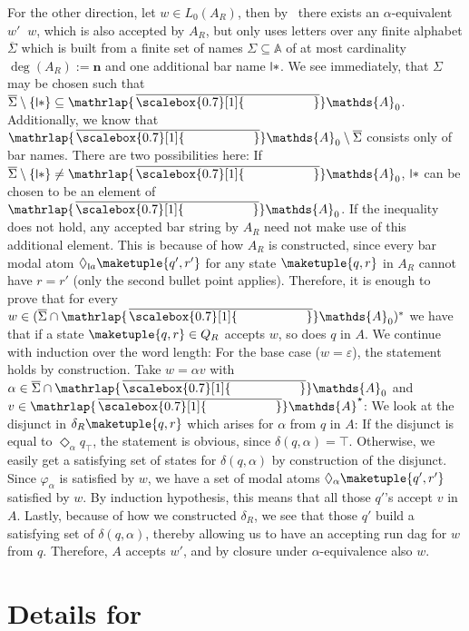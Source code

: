 \documentclass[10pt,a4paper]{amsart}
\theoremstyle{definition}
\newcommand{\seq}{\subseteq}
\newcommand{\At}{\mathds{A}}
\newcommand{\barAs}{\barNames^{\star}}
\newcommand{\names}{\At}
\newcommand{\set}[1]{\{#1\}}
\DeclareMathOperator{\alphaequiv}{\equiv_{\alpha}}
\newcommand{\mybar}[3]{%
  \mathrlap{\hspace{#2}\overline{\scalebox{#1}[1]{\phantom{\ensuremath{#3}}}}}\ensuremath{#3}
}
\newcommand{\barNames}{{\mybar{0.7}{1.25pt}{\names}}}
\newcommand{\midmid}{\hspace{0.2ex}{\rule[-0.1ex]{0.6pt}{1.65ex}}\hspace{0.2ex}}
\newcommand{\scriptmidmid}{\hspace{0.2ex}{\rule[-0.1ex]{0.6pt}{1.1ex}}\hspace{0.2ex}}
\newcommand{\newletter}[1]{{\midmid}#1}
\newcommand{\scriptnew}[1]{{\scriptmidmid}#1}
\begin{document}
\begin{IEEEproof}
  For the other direction, let $w \in L_0(A_R)$, then by~ there exists an
  $\alpha$-equivalent $w' \alphaequiv w$, which is also accepted by $A_R$, but only uses letters over any finite
  alphabet $\overline{\Sigma}$ which is built from a finite set of names $\Sigma \seq
  \names$ of at most cardinality $\deg(A_R) := \mathbf{n}$ and one additional bar name $\newletter{\ast}$.
  We see immediately, that $\Sigma$ may be chosen such that $\overline{\Sigma} \setminus \set{\newletter{\ast}}
  \seq \barNames_0$. Additionally, we know that $\barNames_0 \setminus \overline{\Sigma}$ consists only of
  bar names. There are two possibilities here: If $\overline{\Sigma} \setminus \set{\newletter{\ast}} \neq
  \barNames_0$, $\newletter{\ast}$ can be chosen to be an element of $\barNames_0$. If the inequality
  does not hold, any accepted bar string by $A_R$ need not make use of this additional element.
  This is because of how $A_R$ is constructed, since every bar modal atom $\Diamond_{\scriptnew{a}} \maketuple{q',r'}$
  for any state $\maketuple{q, r}$ in $A_R$ cannot have $r = r'$ (only the second bullet point applies).
  Therefore, it is enough to prove that for every $w \in (\overline{\Sigma} \cap \barNames_0)^*$ we have that
  if a state $\maketuple{q, r} \in Q_R$ accepts $w$, so does $q$ in $A$. We continue with induction over
  the word length: For the base case ($w = \varepsilon$), the statement holds by construction. Take
  $w = \alpha v$ with $\alpha \in \overline{\Sigma} \cap \barNames_0$ and $v \in \barAs$: We look at the
  disjunct in $\delta_R\maketuple{q, r}$ which arises for $\alpha$ from $q$ in $A$: If the disjunct is equal
  to $\Diamond_\alpha q_{\top}$, the statement is obvious, since $\delta(q, \alpha) = \top$. Otherwise,
  we easily get a satisfying set of states for $\delta(q, \alpha)$ by construction of the disjunct. 
  Since $\varphi_{\alpha}$ is satisfied by $w$, we have a set of modal atoms $\Diamond_{\alpha}
  \maketuple{q', r'}$ satisfied by $w$. By induction hypothesis, this means that all those
  $q'$'s accept $v$ in $A$. Lastly, because of how we constructed $\delta_{R}$, we see that
  those $q'$ build a satisfying set of $\delta(q, \alpha)$, thereby allowing us to have an
  accepting run dag for $w$ from $q$. Therefore, $A$ accepts $w'$, and by closure under
  $\alpha$-equivalence also $w$.
\end{IEEEproof}

\section{Details for~} \label{app:secDA}
\end{document}
